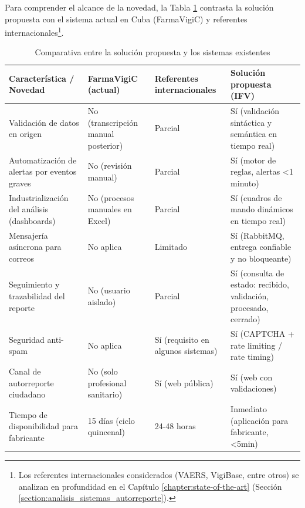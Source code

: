 Para comprender el alcance de la novedad, la Tabla \ref{tab:comparativa_novedad} contrasta la solución propuesta con el sistema actual en Cuba (FarmaVigiC) y referentes internacionales\footnote{Los referentes internacionales considerados (VAERS, VigiBase, entre otros) se analizan en profundidad en el Capítulo \ref{chapter:state-of-the-art} (Sección \ref{section:analisis_sistemas_autorreporte}).}. 


\begin{table}[htbp]
    \centering
    \caption{Comparativa entre la solución propuesta y los sistemas existentes}
    \label{tab:comparativa_novedad}
    \begin{tabular}{|p{3.8cm}|p{3cm}|p{3cm}|p{3.5cm}|}
        \hline
        \textbf{Característica / Novedad} & \textbf{FarmaVigiC (actual)} & \textbf{Referentes internacionales\footnotemark} & \textbf{Solución propuesta (IFV)} \\
        \hline
        Validación de datos en origen & No (transcripción manual posterior) & Parcial & Sí (validación sintáctica y semántica en tiempo real) \\
        \hline
        Automatización de alertas por eventos graves & No (revisión manual) & Parcial & Sí (motor de reglas, alertas <1 minuto) \\
        \hline
        Industrialización del análisis (dashboards) & No (procesos manuales en Excel) & Parcial & Sí (cuadros de mando dinámicos en tiempo real) \\
        \hline
        Mensajería asíncrona para correos & No aplica & Limitado & Sí (RabbitMQ, entrega confiable y no bloqueante) \\
        \hline
        Seguimiento y trazabilidad del reporte & No (usuario aislado) & Parcial & Sí (consulta de estado: recibido, validación, procesado, cerrado) \\
        \hline
        Seguridad anti-spam & No aplica & Sí (requisito en algunos sistemas) & Sí (CAPTCHA + rate limiting / rate timing) \\
        \hline
        Canal de autorreporte ciudadano & No (solo profesional sanitario) & Sí (web pública) & Sí (web con validaciones) \\
        \hline
        Tiempo de disponibilidad para fabricante & 15 días (ciclo quincenal) & 24-48 horas & Inmediato (aplicación para fabricante, <5min) \\
        \hline
    \end{tabular}
\end{table}




